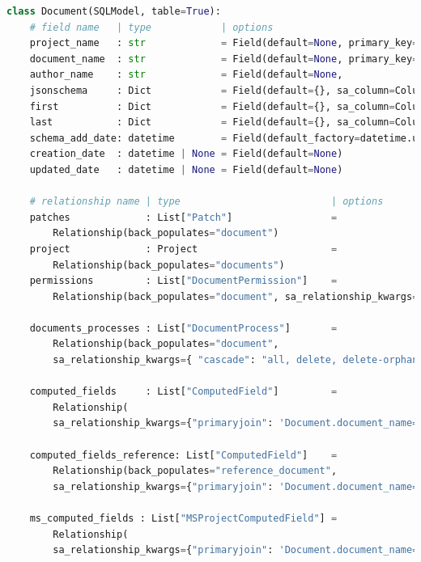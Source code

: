 \documentclass[12pt]{report}
\begin{document}
\begin{lstlisting}[language=Python, caption=Document model]
class Document(SQLModel, table=True):
    # field name   | type            | options
    project_name   : str             = Field(default=None, primary_key=True, foreign_key=Project.Fields.project_name)
    document_name  : str             = Field(default=None, primary_key=True)
    author_name    : str             = Field(default=None,                   foreign_key=User.Fields.user_name)
    jsonschema     : Dict            = Field(default={}, sa_column=Column(JSON))
    first          : Dict            = Field(default={}, sa_column=Column(JSON))
    last           : Dict            = Field(default={}, sa_column=Column(JSON))
    schema_add_date: datetime        = Field(default_factory=datetime.utcnow)
    creation_date  : datetime | None = Field(default=None)
    updated_date   : datetime | None = Field(default=None)

    # relationship name | type                          | options
    patches             : List["Patch"]                 = 
        Relationship(back_populates="document")
    project             : Project                       = 
        Relationship(back_populates="documents")
    permissions         : List["DocumentPermission"]    = 
        Relationship(back_populates="document", sa_relationship_kwargs={ "cascade": "all, delete, delete-orphan"})
        
    documents_processes : List["DocumentProcess"]       = 
        Relationship(back_populates="document", 
        sa_relationship_kwargs={ "cascade": "all, delete, delete-orphan"})
        
    computed_fields     : List["ComputedField"]         = 
        Relationship(
        sa_relationship_kwargs={"primaryjoin": 'Document.document_name==ComputedField.field_document_name', "lazy": "joined", "cascade": "all, delete, delete-orphan"})
        
    computed_fields_reference: List["ComputedField"]    = 
        Relationship(back_populates="reference_document", 
        sa_relationship_kwargs={"primaryjoin": 'Document.document_name==ComputedField.reference_document_name', "lazy": "joined"})
        
    ms_computed_fields : List["MSProjectComputedField"] = 
        Relationship(
        sa_relationship_kwargs={"primaryjoin": 'Document.document_name==MSProjectComputedField.field_document_name', "lazy": "joined", "cascade": "all, delete, delete-orphan"})

\end{lstlisting}
\end{document}
